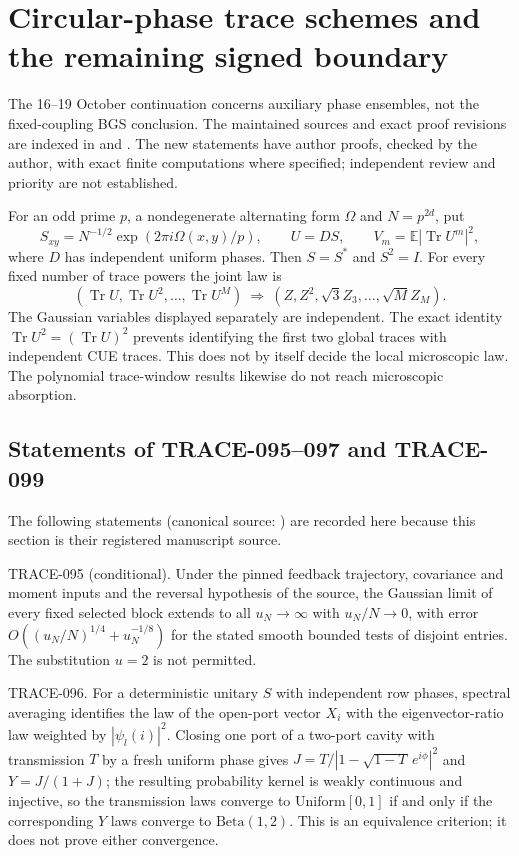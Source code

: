 \section{Circular-phase trace schemes and the remaining signed boundary}
\label{sec:phase-clusters-20261019}

The 16--19 October continuation concerns auxiliary phase ensembles, not
the fixed-coupling BGS conclusion.  The maintained sources and exact proof
revisions are indexed in
 and
.  The new statements have author
proofs, checked by the author, with exact finite computations where specified;
independent review and priority are not established.

For an odd prime $p$, a nondegenerate alternating form $\Omega$ and
$N=p^{2d}$, put
\[
 S_{xy}=N^{-1/2}\exp(2\pi i\Omega(x,y)/p),\qquad U=DS,
 \qquad V_m=\mathbb E|\operatorname{Tr}U^m|^2,
\]
where $D$ has independent uniform phases.  Then $S=S^*$ and $S^2=I$.
For every fixed number of trace powers the joint law is
\[
 (\operatorname{Tr}U,\operatorname{Tr}U^2,\ldots,
       \operatorname{Tr}U^M)
 \ \Longrightarrow\ (Z,Z^2,\sqrt3Z_3,\ldots,\sqrt M Z_M).
\]
The Gaussian variables displayed separately are independent.  The exact
identity $\operatorname{Tr}U^2=(\operatorname{Tr}U)^2$ prevents identifying
the first two global traces with independent CUE traces.  This does not
by itself decide the local microscopic law.  The polynomial trace-window
results likewise do not reach microscopic absorption.

\subsection{Statements of TRACE-095--097 and TRACE-099}

The following statements (canonical source:
) are recorded
here because this section is their registered manuscript source.

TRACE-095 (conditional). Under the pinned feedback trajectory, covariance
and moment inputs and the reversal hypothesis of the source, the Gaussian
limit of every fixed selected block extends to all $u_N\to\infty$ with
$u_N/N\to0$, with error $O((u_N/N)^{1/4}+u_N^{-1/8})$ for the stated
smooth bounded tests of disjoint entries. The substitution $u=2$ is not
permitted.

TRACE-096. For a deterministic unitary $S$ with independent row phases,
spectral averaging identifies the law of the open-port vector $X_i$ with
the eigenvector-ratio law weighted by $|\psi_l(i)|^2$. Closing one port
of a two-port cavity with transmission $T$ by a fresh uniform phase gives
$J=T/|1-\sqrt{1-T}\,e^{i\phi}|^2$ and $Y=J/(1+J)$; the resulting
probability kernel is weakly continuous and injective, so the transmission
laws converge to $\mathrm{Uniform}[0,1]$ if and only if the corresponding
$Y$ laws converge to $\mathrm{Beta}(1,2)$. This is an equivalence
criterion; it does not prove either convergence.

